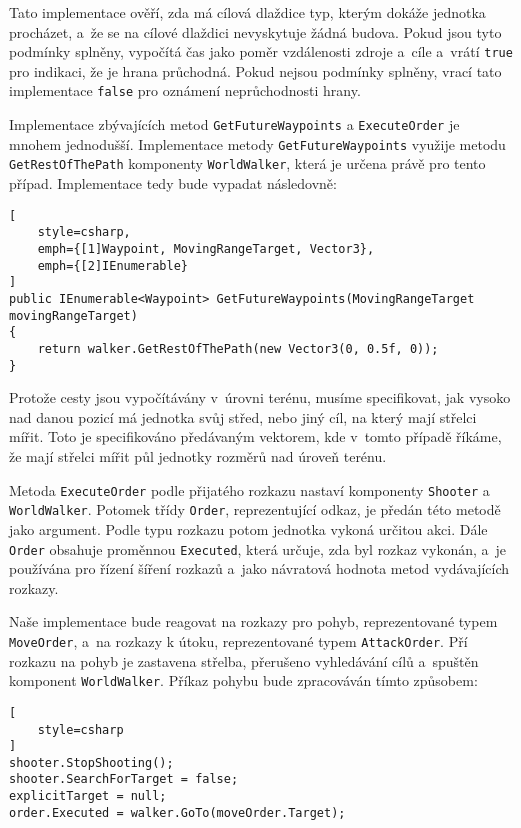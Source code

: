 Tato implementace ověří, zda má cílová dlaždice typ, kterým dokáže jednotka procházet, a~že se na cílové dlaždici nevyskytuje žádná budova. Pokud jsou tyto podmínky splněny, vypočítá čas jako poměr vzdálenosti zdroje a~cíle a~vrátí \texttt{true} pro indikaci, že je hrana průchodná. Pokud nejsou podmínky splněny, vrací tato implementace \texttt{false} pro oznámení neprůchodnosti hrany.


Implementace zbývajících metod \texttt{GetFutureWaypoints} a \texttt{ExecuteOrder} je mnohem jednodušší. Implementace metody \texttt{GetFutureWaypoints} využije metodu \texttt{GetRestOfThePath} komponenty \texttt{WorldWalker}, která je určena právě pro tento případ. Implementace tedy bude vypadat následovně:

\begin{lstlisting}[
	style=csharp,
	emph={[1]Waypoint, MovingRangeTarget, Vector3},
	emph={[2]IEnumerable}
]
public IEnumerable<Waypoint> GetFutureWaypoints(MovingRangeTarget movingRangeTarget)
{
	return walker.GetRestOfThePath(new Vector3(0, 0.5f, 0));
}
\end{lstlisting}

Protože cesty jsou vypočítávány v~úrovni terénu, musíme specifikovat, jak vysoko nad danou pozicí má jednotka svůj střed, nebo jiný cíl, na který mají střelci mířit. Toto je specifikováno předávaným vektorem, kde v~tomto případě říkáme, že mají střelci mířit půl jednotky rozměrů nad úroveň terénu.

Metoda \texttt{ExecuteOrder} podle přijatého rozkazu nastaví komponenty \texttt{Shooter} a \texttt{WorldWalker}. Potomek třídy \texttt{Order}, reprezentující odkaz, je předán této metodě jako argument. Podle typu rozkazu potom jednotka vykoná určitou akci. Dále \texttt{Order} obsahuje proměnnou \texttt{Executed}, která určuje, zda byl rozkaz vykonán, a~je používána pro řízení šíření rozkazů a~jako návratová hodnota metod vydávajících rozkazy. 

Naše implementace bude reagovat na rozkazy pro pohyb, reprezentované typem \texttt{MoveOrder}, a~na rozkazy k útoku, reprezentované typem \texttt{AttackOrder}. Pří rozkazu na pohyb je zastavena střelba, přerušeno vyhledávání cílů a~spuštěn komponent \texttt{WorldWalker}. Příkaz pohybu bude zpracováván tímto způsobem:
\begin{lstlisting}[
	style=csharp
]
shooter.StopShooting();
shooter.SearchForTarget = false;
explicitTarget = null;
order.Executed = walker.GoTo(moveOrder.Target);
\end{lstlisting}

